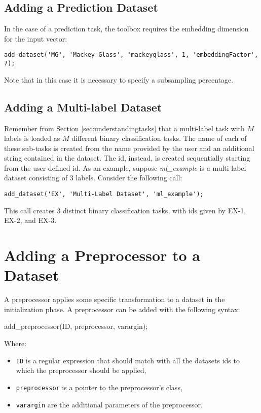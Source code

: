 \subsection{Adding a Prediction Dataset}

In the case of a prediction task, the toolbox requires the embedding dimension for the input vector:

\begin{lstlisting}
add_dataset('MG', 'Mackey-Glass', 'mackeyglass', 1, 'embeddingFactor', 7);
\end{lstlisting}

\noindent Note that in this case it is necessary to specify a subsampling percentage.

\subsection{Adding a Multi-label Dataset}
\label{sec:chap2:multilabeldataset}

Remember from Section \ref{sec:understandingtasks} that a multi-label task with $M$ labels is loaded as $M$ different binary classification tasks. The name of each of these sub-tasks is created from the name provided by the user and an additional string contained in the dataset. The id, instead, is created sequentially starting from the user-defined id. As an example, suppose \textit{ml\_example} is a multi-label dataset consisting of $3$ labels. Consider the following call:

\begin{lstlisting}
add_dataset('EX', 'Multi-Label Dataset', 'ml_example');
\end{lstlisting}

\noindent This call creates $3$ distinct binary classification tasks, with ids given by EX-1, EX-2, and EX-3.

\section{Adding a Preprocessor to a Dataset}

A preprocessor applies some specific transformation to a dataset in the initialization phase. A preprocessor can be added with the following syntax:

\begin{console}
add_preprocessor(ID, preprocessor, varargin);
\end{console}

\noindent Where:

\begin{itemize}
\item \verb|ID| is a regular expression that should match with all the datasets ids to which the preprocessor should be applied,
\item \verb|preprocessor| is a pointer to the preprocessor’s class,
\item \verb|varargin| are the additional parameters of the preprocessor.
\end{itemize}

